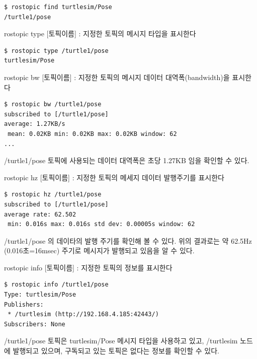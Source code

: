 \begin{lstlisting}[language=ROS]
$ rostopic find turtlesim/Pose
/turtle1/pose
\end{lstlisting}

\vspace{\baselineskip}
\noindent
{}\circled{\thenum} rostopic type [토픽이름] : 지정한 토픽의 메시지 타입을 표시한다

\begin{lstlisting}[language=ROS]
$ rostopic type /turtle1/pose 
turtlesim/Pose
\end{lstlisting}

\vspace{\baselineskip}
\noindent
{}\circled{\thenum} rostopic bw [토픽이름] : 지정한 토픽의 메시지 데이터 대역폭(bandwidth)을 표시한다

\begin{lstlisting}[language=ROS]
$ rostopic bw /turtle1/pose 
subscribed to [/turtle1/pose]
average: 1.27KB/s
 mean: 0.02KB min: 0.02KB max: 0.02KB window: 62
...
\end{lstlisting}

\noindent
/turtle1/pose 토픽에 사용되는 데이터 대역폭은 초당 1.27KB 임을 확인할 수 있다.

\vspace{\baselineskip}
\noindent
{}\circled{\thenum} rostopic hz [토픽이름] : 지정한 토픽의 메세지 데이터 발행주기를 표시한다

\begin{lstlisting}[language=ROS]
$ rostopic hz /turtle1/pose 
subscribed to [/turtle1/pose]
average rate: 62.502
 min: 0.016s max: 0.016s std dev: 0.00005s window: 62
\end{lstlisting}

\noindent
/turtle1/pose 의 데이타의 발행 주기를 확인해 볼 수 있다. 위의 결과로는 약 62.5Hz (0.016초=16msec) 주기로 메시지가 발행되고 있음을 알 수 있다.

\vspace{\baselineskip}
\noindent
{}\circled{\thenum} rostopic info [토픽이름] : 지정한 토픽의 정보를 표시한다

\begin{lstlisting}[language=ROS]
$ rostopic info /turtle1/pose 
Type: turtlesim/Pose
Publishers: 
 * /turtlesim (http://192.168.4.185:42443/)
Subscribers: None
\end{lstlisting}

\noindent
/turtle1/pose 토픽은 turtlesim/Pose 메시지 타입을 사용하고 있고, /turtlesim 노드에 발행되고 있으며, 구독되고 있는 토픽은 없다는 정보를 확인할 수 있다. 

